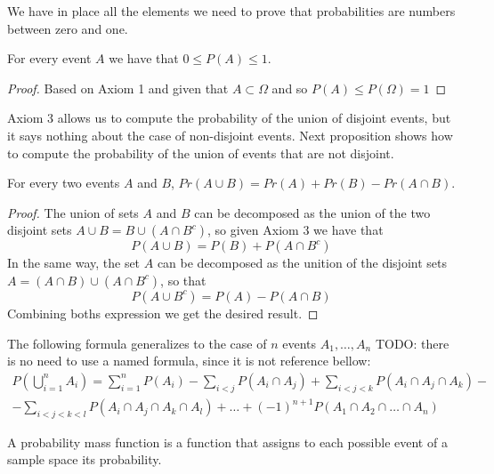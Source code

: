 We have in place all the elements we need to prove that probabilities are numbers between zero and one.

\begin{proposition}
For every event $A$ we have that $0 \leq P \left( A \right) \leq 1$.
\end{proposition}
\begin{proof}
Based on Axiom 1 and given that $A \subset \Omega$ and so $P \left( A \right) \leq P \left( \Omega \right) = 1$
\end{proof}

Axiom 3 allows us to compute the probability of the union of disjoint events, but it says nothing about the case of non-disjoint events. Next proposition shows how to compute the probability of the union of events that are not disjoint.

\begin{proposition}
For every two events $A$ and $B$, $Pr\left(A\cup B\right)=Pr\left(A\right)+Pr\left(B\right)-Pr\left(A\cap B\right)$.
\end{proposition}
\begin{proof}
The union of sets $A$ and $B$ can be decomposed as the union of the two disjoint sets $A \cup B = B \cup \left( A \cap B^c \right)$, so given Axiom 3 we have that
\[
P \left( A \cup B \right) = P \left( B \right) + P \left( A \cap B^c \right)
\]
In the same way, the set $A$ can be decomposed as the unition of the disjoint sets $A = \left( A \cap B \right) \cup \left( A \cap B^c \right)$, so that
\[
P \left( A \cup B^c \right) = P \left( A \right) - P \left( A \cap B \right)
\]
Combining boths expression we get the desired result.
\end{proof}

The following formula generalizes to the case of $n$ events $A_1, \ldots, A_n$ {\color{red} TODO: there is no need to use a named formula, since it is not reference bellow}:
\begin{multline}
P \left( \bigcup_{i=1}^n A_i \right) = \sum_{i=1}^n P \left( A_i \right) - \sum_{i<j} P \left( A_i \cap A_j \right) + \sum_{i<j<k} P \left( A_i \cap A_j \cap A_k \right) - \\
 - \sum_{i<j<k<l} P \left( A_i \cap A_j \cap A_k \cap A_l \right) + \ldots +  (-1)^{n+1} P \left( A_1 \cap A_2 \cap \ldots \cap A_n \right) 
\end{multline}

A probability mass function is a function that assigns to each possible event of a sample space its probability.

